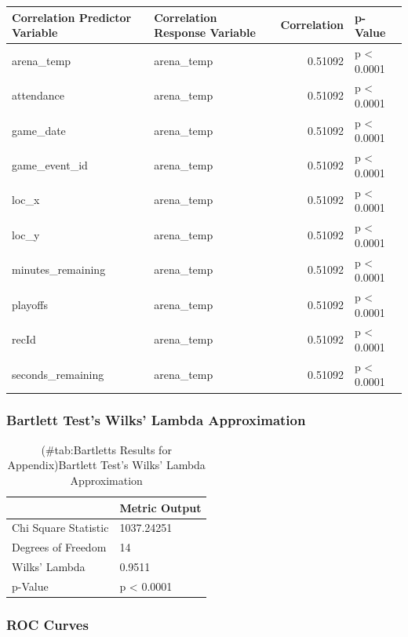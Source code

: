 \documentclass[american,]{article}
\begin{document}
\begin{table}[!h]
\centering
\begin{tabular}{llrl}
\toprule
Correlation Predictor Variable & Correlation Response Variable & Correlation & p-Value\\
\midrule
arena\_temp & arena\_temp & 0.51092 & p < 0.0001\\
attendance & arena\_temp & 0.51092 & p < 0.0001\\
game\_date & arena\_temp & 0.51092 & p < 0.0001\\
game\_event\_id & arena\_temp & 0.51092 & p < 0.0001\\
loc\_x & arena\_temp & 0.51092 & p < 0.0001\\
\addlinespace
loc\_y & arena\_temp & 0.51092 & p < 0.0001\\
minutes\_remaining & arena\_temp & 0.51092 & p < 0.0001\\
playoffs & arena\_temp & 0.51092 & p < 0.0001\\
recId & arena\_temp & 0.51092 & p < 0.0001\\
seconds\_remaining & arena\_temp & 0.51092 & p < 0.0001\\
\bottomrule
\end{tabular}
\end{table}

\hypertarget{bartlett-tests-wilks-lambda-approximation}{%
\subsubsection{Bartlett Test's Wilks' Lambda Approximation}\label{bartlett-tests-wilks-lambda-approximation}}

\begin{table}[t]

\caption{(\#tab:Bartletts Results for Appendix)Bartlett Test's Wilks' Lambda Approximation}
\centering
\begin{tabular}{ll}
\toprule
  & Metric Output\\
\midrule
Chi Square Statistic & 1037.24251\\
Degrees of Freedom & 14\\
Wilks' Lambda & 0.9511\\
p-Value & p < 0.0001\\
\bottomrule
\end{tabular}
\end{table}

\hypertarget{roc-curves}{%
\subsubsection{ROC Curves}\label{roc-curves}}
\end{document}
